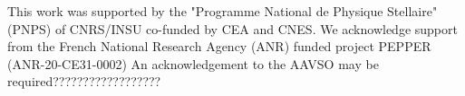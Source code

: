 \documentclass{aa}
\begin{document}
\begin{acknowledgements}
    This work was supported by the "Programme National de Physique Stellaire" (PNPS) of CNRS/INSU co-funded by CEA and CNES.
    We acknowledge support from the French National Research Agency (ANR)
    funded project PEPPER (ANR-20-CE31-0002)
    An acknowledgement to the AAVSO may be required??????????????????
    \end{acknowledgements}
    
    
    
    
\end{document}
